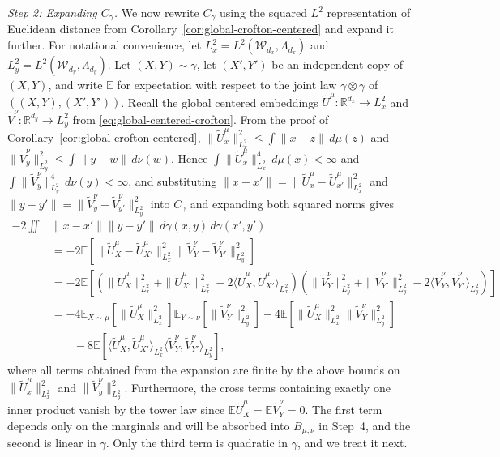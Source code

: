 \documentclass[11pt]{amsart}
\theoremstyle{definition}
\theoremstyle{remark}
\newcommand{\R}{\mathbb{R}}
\newcommand{\E}{\mathbb{E}}
\newcommand{\1}{\mathbf{1}}
\numberwithin{equation}{section}
\begin{document}
\emph{Step 2: Expanding $C_\gamma$.}
We now rewrite $C_\gamma$ using the squared $L^2$ representation of
Euclidean distance from
Corollary~\ref{cor:global-crofton-centered} and expand it further.
For notational convenience, let
$L^2_x=L^2(\mathcal W_{d_x},\Lambda_{d_x})$ and
$L^2_y=L^2(\mathcal W_{d_y},\Lambda_{d_y})$.
Let $(X,Y)\sim\gamma$, let $(X',Y')$ be an independent copy of $(X,Y)$,
and write $\E$ for expectation with respect to the joint law
$\gamma\otimes\gamma$ of $((X,Y),(X',Y'))$. Recall the global centered
embeddings $\widetilde U^\mu:\R^{d_x}\to L^2_x$ and
$\widetilde V^\nu:\R^{d_y}\to L^2_y$ from \eqref{eq:global-centered-crofton}. From the proof of Corollary~\ref{cor:global-crofton-centered},
$\|\widetilde U_x^\mu\|_{L^2_x}^2
\leq\int\|x-z\|\,d\mu(z)$ and
$\|\widetilde V_y^\nu\|_{L^2_y}^2
\leq\int\|y-w\|\,d\nu(w)$. Hence
$\int\|\widetilde U_x^\mu\|_{L^2_x}^4\,d\mu(x)<\infty$ and
$\int\|\widetilde V_y^\nu\|_{L^2_y}^4\,d\nu(y)<\infty$, and substituting
$\|x-x'\|=\|\widetilde U_x^\mu-\widetilde U_{x'}^\mu\|_{L^2_x}^2$ and
$\|y-y'\|=\|\widetilde V_y^\nu-\widetilde V_{y'}^\nu\|_{L^2_y}^2$ into $C_\gamma$ and
expanding both squared norms gives
\begin{align*}
-2\iint
&\|x-x'\|\|y-y'\|
\,d\gamma(x,y)\,d\gamma(x',y')\\
&=
-2\E\left[
\|\widetilde U_X^\mu-\widetilde U_{X'}^\mu\|_{L^2_x}^2
\|\widetilde V_Y^\nu-\widetilde V_{Y'}^\nu\|_{L^2_y}^2
\right]\\
&=
-2\E\left[
\left(
\|\widetilde U_X^\mu\|_{L^2_x}^2
+
\|\widetilde U_{X'}^\mu\|_{L^2_x}^2
-
2\langle \widetilde U_X^\mu,\widetilde U_{X'}^\mu\rangle_{L^2_x}
\right)
\left(
\|\widetilde V_Y^\nu\|_{L^2_y}^2
+
\|\widetilde V_{Y'}^\nu\|_{L^2_y}^2
-
2\langle \widetilde V_Y^\nu,\widetilde V_{Y'}^\nu\rangle_{L^2_y}
\right)
\right]\\
&=
-4\E_{X\sim\mu}\left[\|\widetilde U_X^\mu\|_{L^2_x}^2\right]
\E_{Y\sim\nu}\left[\|\widetilde V_Y^\nu\|_{L^2_y}^2\right]
-4\E\left[
\|\widetilde U_X^\mu\|_{L^2_x}^2
\|\widetilde V_Y^\nu\|_{L^2_y}^2
\right]\\
&\qquad
-8\E\left[
\langle \widetilde U_X^\mu,\widetilde U_{X'}^\mu\rangle_{L^2_x}
\langle \widetilde V_Y^\nu,\widetilde V_{Y'}^\nu\rangle_{L^2_y}
\right],
\end{align*}
where all terms obtained from the expansion are finite by the above bounds on $\|\widetilde{U}_x^\mu\|^2_{L_x^2}$ and $\|\widetilde{V}_y^\nu\|^2_{L_y^2}$. Furthermore, the cross terms containing exactly one inner product vanish by
the tower law since $\E \widetilde U_X^\mu=\E \widetilde V_Y^\nu=0$. The first term depends
only on the marginals and will be absorbed into $B_{\mu,\nu}$ in Step~4,
and the second is linear in $\gamma$. Only the third term is quadratic
in $\gamma$, and we treat it next.
\end{document}
